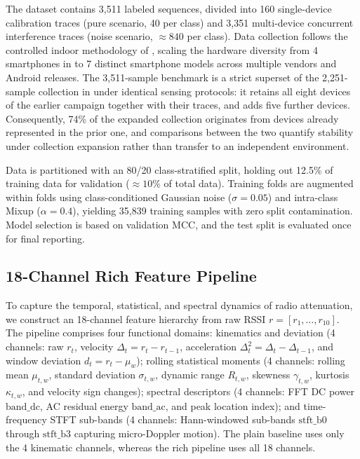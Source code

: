 The dataset contains 3,511 labeled sequences, divided into 160 single-device calibration traces (pure scenario, 40 per class) and 3,351 multi-device concurrent interference traces (noise scenario, $\approx 840$ per class). Data collection follows the controlled indoor methodology of \cite{ribeiro2026eucnc}, scaling the hardware diversity from 4 smartphones in \cite{ribeiro2026eucnc} to 7 distinct smartphone models across multiple vendors and Android releases. The 3,511-sample benchmark is a strict superset of the 2,251-sample collection in \cite{matos2026icaisf} under identical sensing protocols: it retains all eight devices of the earlier campaign together with their traces, and adds five further devices. Consequently, 74\% of the expanded collection originates from devices already represented in the prior one, and comparisons between the two quantify stability under collection expansion rather than transfer to an independent environment.

Data is partitioned with an 80/20 class-stratified split, holding out 12.5\% of training data for validation ($\approx 10\%$ of total data). Training folds are augmented within folds using class-conditioned Gaussian noise ($\sigma = 0.05$) and intra-class Mixup ($\alpha = 0.4$), yielding 35,839 training samples with zero split contamination. Model selection is based on validation \ac{MCC}, and the test split is evaluated once for final reporting.

\subsection{18-Channel Rich Feature Pipeline}

To capture the temporal, statistical, and spectral dynamics of radio attenuation, we construct an 18-channel feature hierarchy from raw \ac{RSSI} $r = [r_1, \dots, r_{10}]$. The pipeline comprises four functional domains: kinematics and deviation (4 channels: raw $r_t$, velocity $\Delta_t = r_t - r_{t-1}$, acceleration $\Delta^2_t = \Delta_t - \Delta_{t-1}$, and window deviation $d_t = r_t - \mu_w$); rolling statistical moments (4 channels: rolling mean $\mu_{t,w}$, standard deviation $\sigma_{t,w}$, dynamic range $R_{t,w}$, skewness $\gamma_{t,w}$, kurtosis $\kappa_{t,w}$, and velocity sign changes); spectral descriptors (4 channels: FFT DC power $\text{band\_dc}$, AC residual energy $\text{band\_ac}$, and peak location index); and time-frequency STFT sub-bands (4 channels: Hann-windowed sub-bands $\text{stft\_b0}$ through $\text{stft\_b3}$ capturing micro-Doppler motion). The plain baseline uses only the 4 kinematic channels, whereas the rich pipeline uses all 18 channels.

